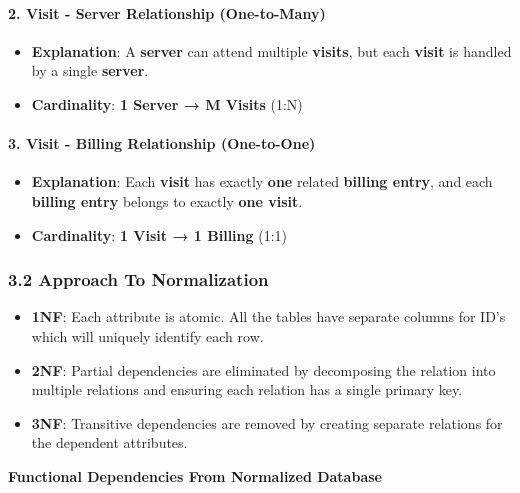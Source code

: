 \documentclass[
]{article}
\providecommand{\tightlist}{%
  \setlength{\itemsep}{0pt}\setlength{\parskip}{0pt}}
\begin{document}
\paragraph{2. Visit - Server Relationship
(One-to-Many)}\label{visit---server-relationship-one-to-many}

\begin{itemize}
\tightlist
\item
  \textbf{Explanation}: A \textbf{server} can attend multiple
  \textbf{visits}, but each \textbf{visit} is handled by a single
  \textbf{server}.
\item
  \textbf{Cardinality}: \textbf{1 Server → M Visits} (1:N)
\end{itemize}

\paragraph{3. Visit - Billing Relationship
(One-to-One)}\label{visit---billing-relationship-one-to-one}

\begin{itemize}
\tightlist
\item
  \textbf{Explanation}: Each \textbf{visit} has exactly \textbf{one}
  related \textbf{billing entry}, and each \textbf{billing entry}
  belongs to exactly \textbf{one visit}.
\item
  \textbf{Cardinality}: \textbf{1 Visit → 1 Billing} (1:1)
\end{itemize}

\subsubsection{\texorpdfstring{\textbf{3.2 Approach To
Normalization}}{3.2 Approach To Normalization}}\label{approach-to-normalization}

\begin{itemize}
\item
  \textbf{1NF}: Each attribute is atomic. All the tables have separate
  columns for ID's which will uniquely identify each row.
\item
  \textbf{2NF}: Partial dependencies are eliminated by decomposing the
  relation into multiple relations and ensuring each relation has a
  single primary key.
\item
  \textbf{3NF}: Transitive dependencies are removed by creating separate
  relations for the dependent attributes.
\end{itemize}

\textbf{Functional Dependencies From Normalized Database}
\end{document}
